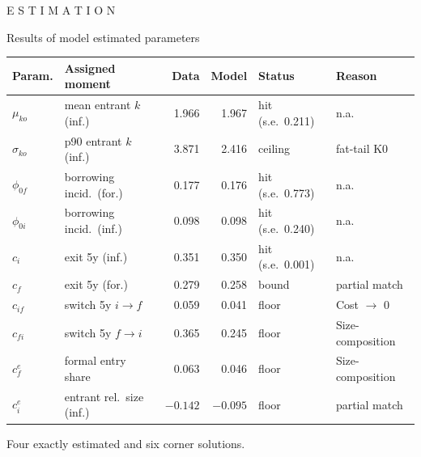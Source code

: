 \documentclass[11pt,aspectratio=169]{beamer}
\providecommand{\infml}{i}
\providecommand{\fml}{f}
\begin{document}

\begin{frame}[noframenumbering]{}

\centering
\Huge
E S T I M A T I O N

\end{frame}
 

\begin{frame}{Results of model estimated parameters}
\begin{center}
\renewcommand{\arraystretch}{1.12}
\begin{tabular}{llrrll}
\toprule
Param. & Assigned moment & Data & Model & Status & Reason \\
\midrule
$\mu_{ko}$ & mean entrant $k$ (inf.) & 1.966 & 1.967 & hit
 \;(s.e.\ 0.211) & n.a. \\
$\sigma_{ko}$ & p90 entrant $k$ (inf.) & 3.871 & 2.416 & ceiling & fat-tail K0 \\
$\phi_{0f}$ & borrowing incid.\ (for.) & 0.177 & 0.176 & hit
 \;(s.e.\ 0.773) & n.a. \\
$\phi_{0i}$ & borrowing incid.\ (inf.) & 0.098 & 0.098 &
 hit \;(s.e.\ 0.240) & n.a. \\
$c_i$ & exit 5y (inf.) & 0.351 & 0.350 & hit
 \;(s.e.\ 0.001) & n.a. \\
$c_f$ & exit 5y (for.) & 0.279 & 0.258 & bound & partial match \\
$c_{if}$ & switch 5y $\infml{\to}\fml$ & 0.059 & 0.041 &
 floor & Cost $\to$ 0 \\
$c_{fi}$ & switch 5y $\fml{\to}\infml$ & 0.365 & 0.245 &
 floor & Size-composition \\
$c^e_f$ & formal entry share & 0.063 & 0.046 & floor & Size-composition  \\
$c^e_i$ & entrant rel.\ size (inf.) & $-0.142$ & $-0.095$ & floor & partial match  \\
\bottomrule
\end{tabular}
\end{center}
\smallskip
Four exactly estimated and six corner solutions.

\end{frame}
 
\end{document}
